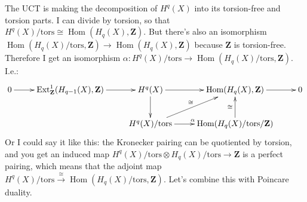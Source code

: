 \documentclass{amsart}
\theoremstyle{theorem}
\theoremstyle{definition}
\DeclareMathOperator{\Ext}{Ext}
\DeclareMathOperator{\Hom}{Hom}
\newcommand{\Z}{\mathbf Z}
\begin{document}
The UCT is making the decomposition of $H^q(X)$ into its torsion-free and torsion parts. I can divide by torsion, so that $H^q(X)/\mathrm{tors}\cong \Hom(H_q(X),\Z)$. But there's also an isomorphism $\Hom(H_q(X)/\mathrm{tors},\Z)\to \Hom(H_q(X),\Z)$ because $\Z$ is torsion-free. Therefore I get an isomorphism $\alpha:H^q(X)/\mathrm{tors}\to \Hom(H_q(X)/\mathrm{tors},\Z)$. I.e.:
\begin{equation*}
\xymatrix{
	0\ar[r] & \Ext^1_\Z(H_{q-1}(X),\Z)\ar[r] & H^{q}(X)\ar[r]\ar[d] & \Hom(H_q(X),\Z)\ar[r] & 0\\
 & & H^q(X)/\mathrm{tors}\ar[ur]^{\cong}\ar[r]^{\alpha} & \Hom(H_q(X)/\mathrm{tors}/\Z)\ar[u]^{\cong}
}
\end{equation*}
Or I could say it like this: the Kronecker pairing can be quotiented by torsion, and you get an induced map $H^q(X)/\mathrm{tors}\otimes H_q(X)/\mathrm{tors}\to\Z$ is a perfect pairing, which means that the adjoint map $H^q(X)/\mathrm{tors}\xrightarrow{\cong}\Hom(H_q(X)/\mathrm{tors},\Z)$. Let's combine this with Poincare duality.
\end{document}
